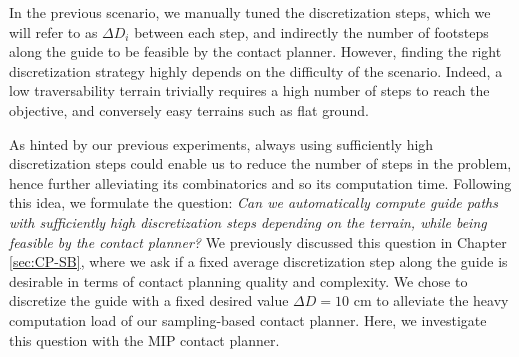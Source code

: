In the previous scenario, we manually tuned the discretization steps, which we will refer to as $\Delta D_i$ between each step, and indirectly the number of footsteps along the guide to be feasible by the contact planner. However, finding the right discretization strategy highly depends on the difficulty of the scenario. Indeed, a low traversability terrain trivially requires a high number of steps to reach the objective, and conversely easy terrains such as flat ground.


As hinted by our previous experiments, always using sufficiently high discretization steps could enable us to reduce the number of steps in the problem, hence further alleviating its combinatorics and so its computation time.
Following this idea, we formulate the question: \textit{Can we automatically compute guide paths with sufficiently high discretization steps depending on the terrain, while being feasible by the contact planner?}
We previously discussed this question in Chapter \ref{sec:CP-SB}, where we ask if a fixed average discretization step along the guide is desirable in terms of contact planning quality and complexity. We chose to discretize the guide with a fixed desired value $\Delta D=10$ cm to alleviate the heavy computation load of our sampling-based contact planner.
Here, we investigate this question with the MIP contact planner.


